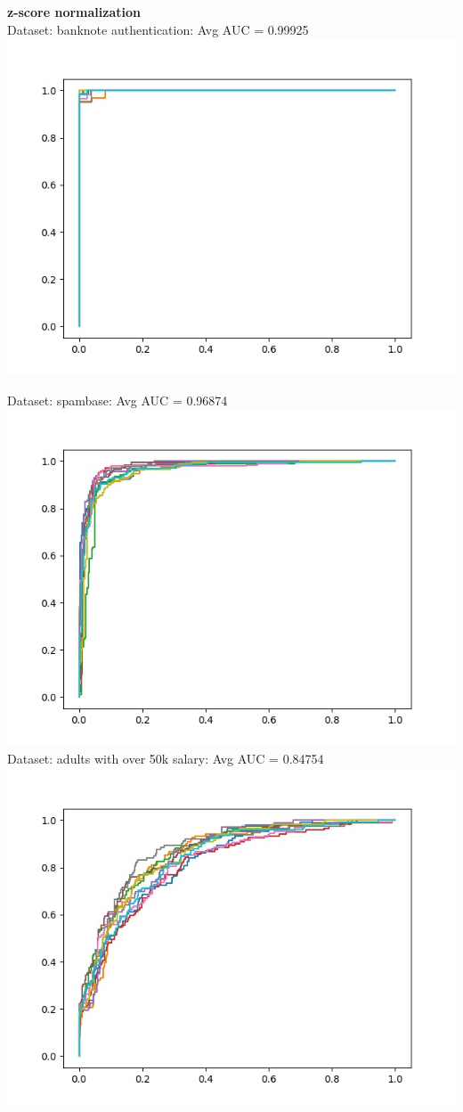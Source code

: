 \documentclass[twoside]{article}
\begin{document}
\textbf{z-score normalization}\\
Dataset: banknote authentication: Avg AUC = 0.99925\\
\includegraphics[scale=0.4]{Plots/Banknote_Z_Score.jpg}

Dataset: spambase: Avg AUC = 0.96874\\
\includegraphics[scale=0.4]{Plots/Spambase_Z_Score.jpg}
\newpage
Dataset: adults with over 50k salary: Avg AUC = 0.84754\\
\includegraphics[scale=0.4]{Plots/Adult_Z_Score.jpg}
\end{document}
